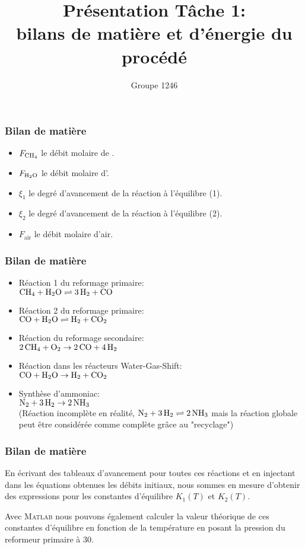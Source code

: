 \documentclass[10pt]{beamer}
\title{Présentation Tâche 1:\\ bilans de matière et d’énergie du procédé
}
\author{Groupe 1246}
\institute{École Polytechnique de Louvain}
\date{}
\begin{document}
\begin{frame}
\titlepage
\end{frame}


\begin{frame}
\frametitle{Bilan de matière}

\begin{itemize}
	\item $F_{}$ le débit molaire de \ce{CH4}.
	\item $F_{}$ le débit molaire d'\ce{H2O}.
	\item $\xi_1$ le degré d'avancement de la réaction à l'équilibre (1).
	\item $\xi_2$ le degré d'avancement de la réaction à l'équilibre (2).
	\item $F_{\text{air}}$ le débit molaire d'air.
\end{itemize}

\end{frame}



\begin{frame}
\frametitle{Bilan de matière}

\begin{itemize}
	\item Réaction 1 du reformage primaire:\\
	$\ce{CH_4} + \ce{H_{2}O} \rightleftharpoons \ce{3H_2} + \ce{CO}$
	\item Réaction 2 du reformage primaire:\\
	$\ce{CO} + \ce{H_{2}O} \rightleftharpoons \ce{H_2} + \ce{CO_2}$ 
	\item Réaction du reformage secondaire:\\
	$\ce{2CH_4} + \ce{O_2} \rightarrow \ce{2CO} + \ce{4H_2}$ 
	\item Réaction dans les réacteurs Water-Gas-Shift:\\
	$\ce{CO} + \ce{H_{2}O} \rightarrow \ce{H_2} + \ce{CO_2}$ 
	\item Synthèse d'ammoniac:\\
	$\ce{N_2} + \ce{3H_2} \rightarrow \ce{2NH_3}$\\
	(Réaction incomplète en réalité, $\ce{N_2} + \ce{3H_2} \rightleftharpoons \ce{2NH_3}$ mais la réaction globale peut être considérée comme complète grâce au "recyclage")
\end{itemize}

\end{frame}



\begin{frame}
\frametitle{Bilan de matière}

En écrivant des tableaux d'avancement pour toutes ces réactions et en injectant dans les équations obtenues les débits initiaux, nous sommes en mesure d'obtenir des expressions pour les constantes d'équilibre $K_1(T)$ et $K_2(T)$.

Avec \textsc{Matlab} nous pouvons également calculer la valeur théorique de ces constantes d'équilibre en fonction de la température en posant la pression du reformeur primaire à \unit{30}{\bbar}.

\end{frame}
\end{document}
